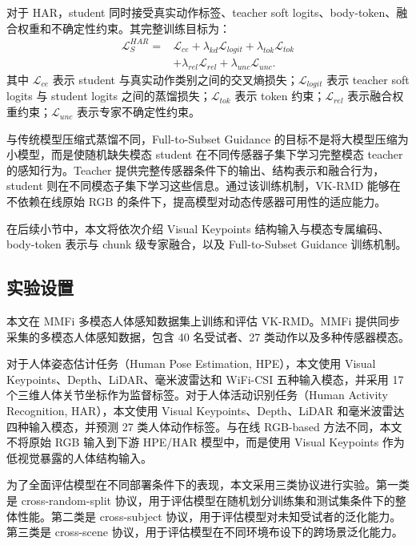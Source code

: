 \documentclass[journal]{IEEEtran}
\newcommand{\parahead}[1]{\vspace{0.4em}\noindent{\textbf{#1}}}
\begin{document}
对于 HAR，student 同时接受真实动作标签、teacher soft logits、body-token、融合权重和不确定性约束。其完整训练目标为：
\begin{equation}
\begin{aligned}
\mathcal{L}^{HAR}_{S}
=
&\mathcal{L}_{ce}
+\lambda_{kd}\mathcal{L}_{logit}
+\lambda_{tok}\mathcal{L}_{tok} \\
&+\lambda_{rel}\mathcal{L}_{rel}
+\lambda_{unc}\mathcal{L}_{unc}.
\end{aligned}
\label{eq:har_student_loss}
\end{equation}
其中 $\mathcal{L}_{ce}$ 表示 student 与真实动作类别之间的交叉熵损失；$\mathcal{L}_{logit}$ 表示 teacher soft logits 与 student logits 之间的蒸馏损失；$\mathcal{L}_{tok}$ 表示 token 约束；$\mathcal{L}_{rel}$ 表示融合权重约束；$\mathcal{L}_{unc}$ 表示专家不确定性约束。

与传统模型压缩式蒸馏不同，Full-to-Subset Guidance 的目标不是将大模型压缩为小模型，而是使随机缺失模态 student 在不同传感器子集下学习完整模态 teacher 的感知行为。Teacher 提供完整传感器条件下的输出、结构表示和融合行为，student 则在不同模态子集下学习这些信息。通过该训练机制，VK-RMD 能够在不依赖在线原始 RGB 的条件下，提高模型对动态传感器可用性的适应能力。

在后续小节中，本文将依次介绍 Visual Keypoints 结构输入与模态专属编码、body-token 表示与 chunk 级专家融合，以及 Full-to-Subset Guidance 训练机制。

\subsection{实验设置}

\parahead{数据集与任务。}
本文在 MMFi 多模态人体感知数据集上训练和评估 VK-RMD。MMFi 提供同步采集的多模态人体感知数据，包含 40 名受试者、27 类动作以及多种传感器模态。

对于人体姿态估计任务（Human Pose Estimation, HPE），本文使用 Visual Keypoints、Depth、LiDAR、毫米波雷达和 WiFi-CSI 五种输入模态，并采用 17 个三维人体关节坐标作为监督标签。对于人体活动识别任务（Human Activity Recognition, HAR），本文使用 Visual Keypoints、Depth、LiDAR 和毫米波雷达四种输入模态，并预测 27 类人体动作标签。与在线 RGB-based 方法不同，本文不将原始 RGB 输入到下游 HPE/HAR 模型中，而是使用 Visual Keypoints 作为低视觉暴露的人体结构输入。

为了全面评估模型在不同部署条件下的表现，本文采用三类协议进行实验。第一类是 cross-random-split 协议，用于评估模型在随机划分训练集和测试集条件下的整体性能。第二类是 cross-subject 协议，用于评估模型对未知受试者的泛化能力。第三类是 cross-scene 协议，用于评估模型在不同环境布设下的跨场景泛化能力。
\end{document}
